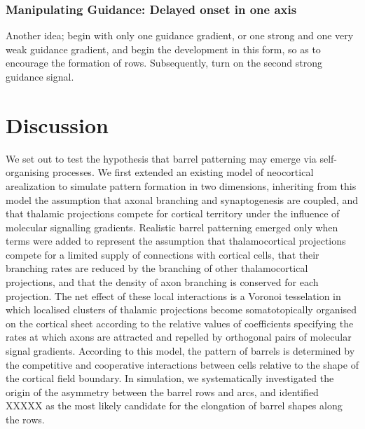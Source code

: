 \documentclass[a4paper,11pt]{article}
\newcommand{\mb}[1]{\mathbf{#1}}
\begin{document}
\subsubsection*{Manipulating Guidance: Delayed onset in one axis}

Another idea; begin with only one guidance gradient, or one strong and
one very weak guidance gradient, and begin the development in this
form, so as to encourage the formation of rows. Subsequently, turn on
the second strong guidance signal.






\section*{Discussion}

We set out to test the hypothesis that barrel patterning may emerge via
self-organising processes. We first extended an existing model of neocortical
arealization to simulate pattern formation in two dimensions, inheriting from
this model the assumption that axonal branching and synaptogenesis are
coupled, and that thalamic projections compete for cortical territory under
the influence of molecular signalling gradients. Realistic barrel patterning
emerged only when terms were added to represent the assumption that
thalamocortical projections compete for a limited supply of connections with
cortical cells, that their branching rates are reduced by the branching of
other thalamocortical projections, and that the density of axon branching is
conserved for each projection. The net effect of these local interactions is a
Voronoi tesselation in which localised clusters of thalamic projections become
somatotopically organised on the cortical sheet according to the relative
values of coefficients specifying the rates at which axons are attracted and
repelled by orthogonal pairs of molecular signal gradients. According to this
model, the pattern of barrels is determined by the competitive and cooperative
interactions between cells relative to the shape of the cortical field
boundary. In simulation, we systematically investigated the origin of the
asymmetry between the barrel rows and arcs, and identified {\color{red} XXXXX}
as the most likely candidate for the elongation of barrel shapes along the
rows.


\end{document}
